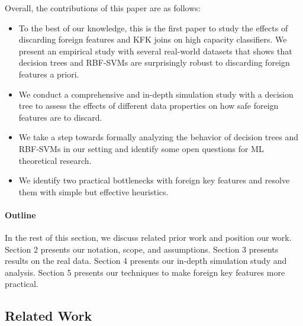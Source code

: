 \documentclass[sigconf]{acmart}
\newenvironment{packeditems}{
\begin{itemize}
  \setlength{\itemsep}{1pt}
  \setlength{\parskip}{0pt}
  \setlength{\parsep}{0pt}
}{\end{itemize}}
\begin{document}
\vspace{1mm}
\noindent Overall, the contributions of this paper are as follows:

\begin{packeditems}
\item To the best of our knowledge, this is the first paper to study the effects of discarding foreign features and KFK joins on high capacity classifiers.
We present an empirical study with several real-world datasets that shows that decision trees and RBF-SVMs are surprisingly robust to discarding foreign features a priori.

\item We conduct a comprehensive and in-depth simulation study with a decision tree to assess the effects of different data properties on how safe foreign features are to discard.

\item We take a step towards formally analyzing the behavior of decision trees and RBF-SVMs in our setting and identify some open questions for ML theoretical research.

\item We identify two practical bottlenecks with foreign key features and resolve them with simple but effective heuristics.
\end{packeditems}


\paragraph*{\textbf{Outline}} In the rest of this section, we discuss related prior work and position our work. Section 2 presents our notation, scope, and assumptions. 
Section 3 presents results on the real data. Section 4 presents our in-depth simulation study and analysis. Section 5 presents our techniques to make foreign key features
more practical. %

\subsection*{Related Work}

\end{document}
